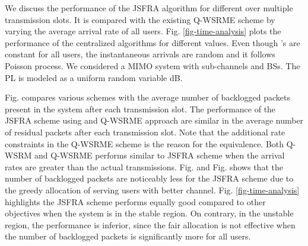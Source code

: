 
We discuss the performance of the \ac{JSFRA} algorithm for different  over multiple transmission slots. It is compared with the existing \ac{Q-WSRME} scheme by varying the average arrival rate  of all users. Fig. \ref{fig-time-analysis} plots the performance of the centralized algorithms for different  values. Even though 's are constant for all users, the instantaneous arrivals are random and it follows Poisson process. We considered a  \ac{MIMO} system with  sub-channels and  \acp{BS}. The \ac{PL} is modeled as a uniform random variable \me{[0,-3]} dB.

Fig.  compares various schemes with the average number of backlogged packets present in the system after each transmission slot. The performance of the \ac{JSFRA} scheme using  and \ac{Q-WSRME} approach are similar in the average number of residual packets after each transmission slot. Note that the additional rate constraints in the \ac{Q-WSRME} scheme is the reason for the equivalence. Both \ac{Q-WSRM} and \ac{Q-WSRME} performs similar to  \ac{JSFRA} scheme when the arrival rates are greater than the actual transmissions. Fig.  and Fig.  shows that the number of backlogged packets are noticeably less for the  \ac{JSFRA} scheme due to the greedy allocation of serving users with better channel. Fig. \ref{fig-time-analysis} highlights the \me{\ell_{\infty}} \ac{JSFRA} scheme performs equally good compared to other objectives when the system is in the stable region. On contrary, in the unstable region, the performance is inferior, since the fair allocation is not effective when the number of backlogged packets is significantly more for all users.
